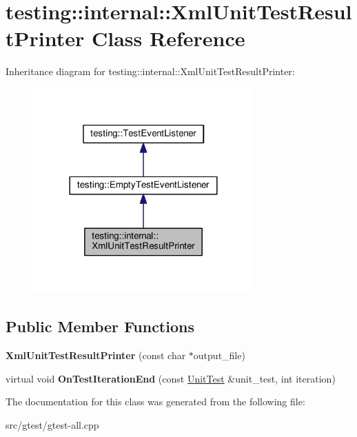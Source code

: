 \hypertarget{classtesting_1_1internal_1_1_xml_unit_test_result_printer}{}\section{testing\+:\+:internal\+:\+:Xml\+Unit\+Test\+Result\+Printer Class Reference}
\label{classtesting_1_1internal_1_1_xml_unit_test_result_printer}


Inheritance diagram for testing\+:\+:internal\+:\+:Xml\+Unit\+Test\+Result\+Printer\+:
\nopagebreak
\begin{figure}[H]
\begin{center}
\leavevmode
\includegraphics[width=240pt]{classtesting_1_1internal_1_1_xml_unit_test_result_printer__inherit__graph}
\end{center}
\end{figure}
\subsection*{Public Member Functions}
\begin{DoxyCompactItemize}
\item 
\mbox{\label{classtesting_1_1internal_1_1_xml_unit_test_result_printer_afdaf88e6764c18ce0dcc3733d7a06e31}} 
{\bfseries Xml\+Unit\+Test\+Result\+Printer} (const char $\ast$output\+\_\+file)
\item 
\mbox{\label{classtesting_1_1internal_1_1_xml_unit_test_result_printer_a2ae986dd2f4f2aed31cc6f3bc8c56898}} 
virtual void {\bfseries On\+Test\+Iteration\+End} (const \mbox{\hyperlink{classtesting_1_1_unit_test}{Unit\+Test}} \&unit\+\_\+test, int iteration)
\end{DoxyCompactItemize}


The documentation for this class was generated from the following file\+:\begin{DoxyCompactItemize}
\item 
src/gtest/gtest-\/all.\+cpp\end{DoxyCompactItemize}
